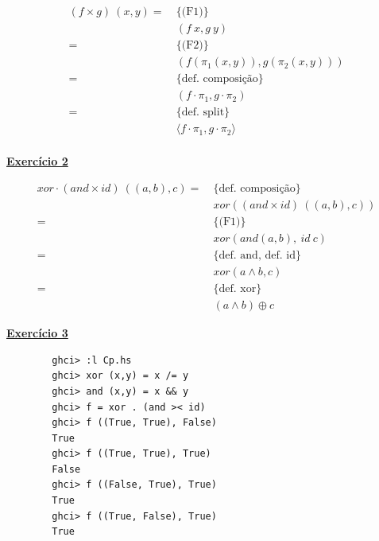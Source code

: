 \documentclass[a4paper,11pt]{article}
\begin{document}
\begin{center}
\begin{minipage}{0.5\textwidth}
	\begin{mdframed}
		\[
		\begin{aligned}
			(f \times g) \  (x, y)
			= \  &\{\text{(F1)}\}\\
			&(f \  x, g \  y) \\
			= \  &\{\text{(F2)}\}\\
			&(f (\pi_1 (x, y)), g (\pi_2 (x, y))) \\
			= \  &\{\text{def. composição}\}\\
			&(f \cdot \pi_1, g \cdot \pi_2) \\
			= \  &\{\text{def. split}\}\\
			&\langle f \cdot \pi_1, g \cdot \pi_2 \rangle \\
		\end{aligned}
		\]
	\end{mdframed}
\end{minipage}
\end{center}

\newpage

	\noindent \underline{\textbf{Exercício 2}}
	
\begin{center}
	\begin{minipage}{0.65\textwidth}
		\begin{mdframed}
			\[
			\begin{aligned}
				xor \cdot (and \times id) \  ((a, b), c)
				= \  &\{\text{def. composição}\}\\
				&xor ((and \times id) \  ((a, b), c))\\
				= \  &\{\text{(F1)}\}\\
				&xor(and (a, b), \ id \  c)\\
				= \  &\{\text{def. and, def. id}\}\\
				&xor(a \land b, c)\\
				= \  &\{\text{def. xor}\}\\
				&(a \land b) \oplus c
			\end{aligned}
			\]
		\end{mdframed}
	\end{minipage}
\end{center}
	
	
	\noindent \underline{\textbf{Exercício 3}}
	
	\begin{verbatim}
		ghci> :l Cp.hs
		ghci> xor (x,y) = x /= y
		ghci> and (x,y) = x && y
		ghci> f = xor . (and >< id)
		ghci> f ((True, True), False)
		True
		ghci> f ((True, True), True)
		False
		ghci> f ((False, True), True)
		True
		ghci> f ((True, False), True)
		True
	\end{verbatim}
	
\end{document}

